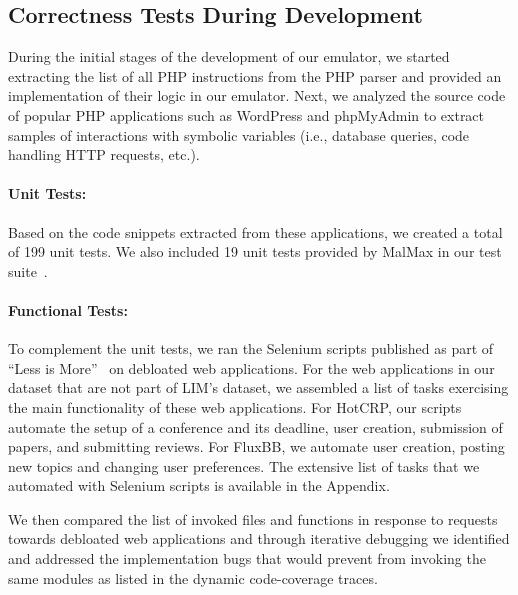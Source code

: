 \subsection{Correctness Tests During Development}

During the initial stages of the development of our emulator, we started extracting the list of all PHP instructions from the PHP parser and provided an implementation of their logic in our emulator. 
Next, we analyzed the source code of popular PHP applications such as WordPress and phpMyAdmin to extract samples of interactions with symbolic variables (i.e., database queries, code handling HTTP requests, etc.).  

\paragraph{Unit Tests:} Based on the code snippets extracted from these applications, we created a total of 199 unit tests. 
We also included 19 unit tests provided by MalMax in our test suite~\cite{naderi2019malmax}. 

\paragraph{Functional Tests:} To complement the unit tests, we ran the Selenium scripts published as part of ``Less is More''~\cite{azad2019less} on debloated web applications. 
For the web applications in our dataset that are not part of LIM's dataset, we assembled a list of tasks exercising the main functionality of these web applications. 
For HotCRP, our scripts automate the setup of a conference and its deadline, user creation, submission of papers, and submitting reviews. 
For FluxBB, we automate user creation, posting new topics and changing user preferences. 
The extensive list of tasks that we automated with Selenium scripts is available in the Appendix. 

We then compared the list of invoked files and functions in response to requests towards debloated web applications and through iterative debugging we identified and addressed the implementation bugs that would prevent \animatedead{} from invoking the same modules as listed in the dynamic code-coverage traces. 
